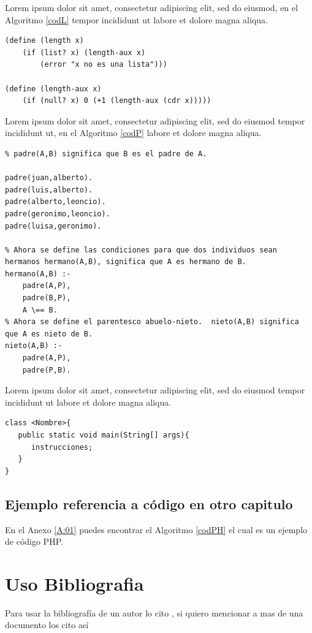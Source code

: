 Lorem ipsum dolor sit amet, consectetur adipiscing elit, sed do eiusmod, en el Algoritmo \ref{codL} tempor incididunt ut labore et dolore magna aliqua.

\lstset{language=LISP}
\begin{lstlisting}[caption= C\'odigo LISP de una Lista, label = codL]
(define (length x)
    (if (list? x) (length-aux x)
        (error "x no es una lista")))
        
(define (length-aux x)
    (if (null? x) 0 (+1 (length-aux (cdr x)))))
\end{lstlisting}

Lorem ipsum dolor sit amet, consectetur adipiscing elit, sed do eiusmod tempor incididunt ut, en el Algoritmo \ref{codP} labore et dolore magna aliqua.


\lstset{language=PROLOG}
\begin{lstlisting}[caption= C\'odigo PROLOG de un \'arbol geneal\'ogico, label=codP]
% Arbol genealogico version 1.
% padre(A,B) significa que B es el padre de A.

padre(juan,alberto).
padre(luis,alberto).
padre(alberto,leoncio). 
padre(geronimo,leoncio).
padre(luisa,geronimo). 

% Ahora se define las condiciones para que dos individuos sean hermanos hermano(A,B), significa que A es hermano de B.
hermano(A,B) :- 
    padre(A,P), 
    padre(B,P), 
    A \== B.
% Ahora se define el parentesco abuelo-nieto.  nieto(A,B) significa que A es nieto de B.
nieto(A,B) :- 
    padre(A,P), 
    padre(P,B). 
\end{lstlisting}

Lorem ipsum dolor sit amet, consectetur adipiscing elit, sed do eiusmod tempor incididunt ut labore et dolore magna aliqua.

   \lstset{language=java}
\begin{lstlisting}[caption= C\'odigo JAVA de una clase]
class <Nombre>{
   public static void main(String[] args){
      instrucciones;
   }
}
\end{lstlisting}

\subsection{Ejemplo referencia a código en otro capitulo}
En el Anexo \ref{A:01} puedes encontrar el Algoritmo \ref{codPH} el cual es un ejemplo de código PHP.



\section{Uso Bibliografia}


Para usar la bibliografía de un autor lo cito \cite{DBLPMH10}, si quiero mencionar a mas de una documento los cito  así \cite{ABC02,JanChomicki2008,SN01}


